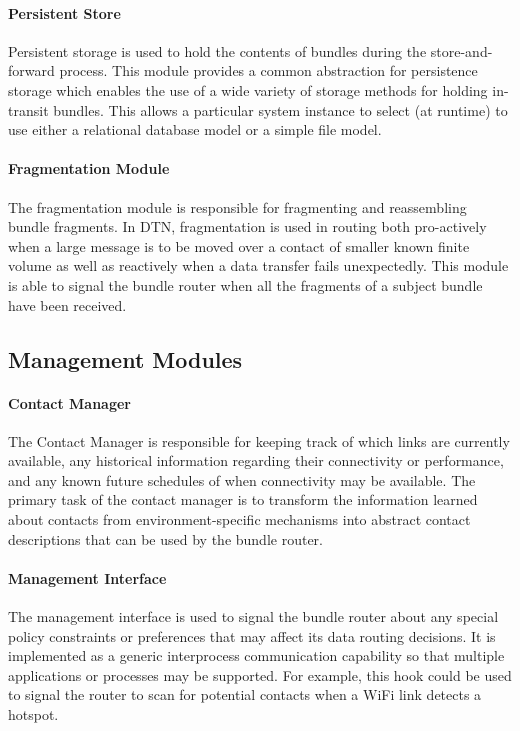 \paragraph{Persistent Store}
Persistent storage is used to hold the contents of bundles during the store-and-forward process. This module provides a common abstraction for persistence storage which enables
the use of a wide variety of storage methods for holding in-transit bundles. This allows a particular system instance to select (at runtime) to use either a relational
database model or a simple file model.

\paragraph{Fragmentation Module}
The fragmentation module is responsible for fragmenting and reassembling bundle fragments. In DTN, fragmentation is used in routing both pro-actively when a large
message is to be moved over a contact of smaller known finite volume as well as reactively when a data 
transfer fails unexpectedly. This module is able to signal the bundle router when all the fragments of a subject bundle have
been received.

\subsection{Management Modules}

\paragraph{Contact Manager}
The Contact Manager is responsible for keeping track of which links are currently available, any historical information regarding their connectivity or performance,
and any known future schedules of when connectivity may be available. The primary task of the contact manager is to
transform the information learned about contacts from environment-specific mechanisms into abstract contact descriptions that can be used by the bundle router.

\paragraph{Management Interface}
The management interface is used to signal the bundle router about any special policy constraints or preferences
that may affect its data routing decisions. It is implemented as a generic interprocess communication capability so that multiple applications or processes may be
supported. For example, this hook could be used to signal the router to scan for potential contacts when a WiFi link detects a hotspot.

